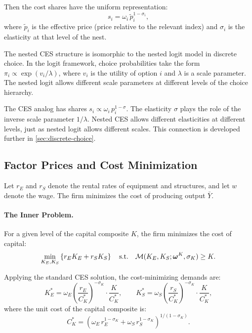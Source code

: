 Then the cost shares have the uniform representation:
\begin{equation}
s_i = \omega_i \, \tilde{p}_i^{1-\sigma_i},
\label{eq:uniform-shares}
\end{equation}
where $\tilde{p}_i$ is the effective price (price relative to the relevant index) and $\sigma_i$ is the elasticity at that level of the nest.

\begin{calloutnote}
The nested CES structure is isomorphic to the nested logit model in discrete choice. In the logit framework, choice probabilities take the form $\pi_i \propto \exp(v_i / \lambda)$, where $v_i$ is the utility of option $i$ and $\lambda$ is a scale parameter. The nested logit allows different scale parameters at different levels of the choice hierarchy.

The CES analog has shares $s_i \propto \omega_i \, p_i^{1-\sigma}$. The elasticity $\sigma$ plays the role of the inverse scale parameter $1/\lambda$. Nested CES allows different elasticities at different levels, just as nested logit allows different scales. This connection is developed further in \cref{sec:discrete-choice}.
\end{calloutnote}

\subsection{Factor Prices and Cost Minimization}
\label{subsec:nested-cost-min}

Let $r_E$ and $r_S$ denote the rental rates of equipment and structures, and let $w$ denote the wage. The firm minimizes the cost of producing output $\bar{Y}$.

\paragraph{The Inner Problem.}
For a given level of the capital composite $K$, the firm minimizes the cost of capital:
\begin{equation}
\min_{K_E, K_S} \left\{ r_E K_E + r_S K_S \right\} \quad \text{s.t.} \quad \mathcal{M}(K_E, K_S; \boldsymbol{\omega}^K, \sigma_K) \geq K.
\label{eq:inner-cost-min}
\end{equation}

Applying the standard CES solution, the cost-minimizing demands are:
\begin{equation}
K_E^* = \omega_E \left( \frac{r_E}{C_K^*} \right)^{-\sigma_K} \cdot \frac{K}{C_K^*}, \qquad K_S^* = \omega_S \left( \frac{r_S}{C_K^*} \right)^{-\sigma_K} \cdot \frac{K}{C_K^*},
\label{eq:inner-demands}
\end{equation}
where the unit cost of the capital composite is:
\begin{equation}
C_K^* = \left( \omega_E \, r_E^{1-\sigma_K} + \omega_S \, r_S^{1-\sigma_K} \right)^{1/(1-\sigma_K)}.
\label{eq:capital-unit-cost}
\end{equation}

